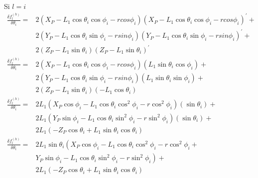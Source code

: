             Si  \( l=i \) 
            \begin{align*}
              \frac{ \delta f_{l}^{ \left( h \right) }}{ \delta  \theta _{i}}=&2 \left( X_{P}-L_{1}\cos  \theta _{i}\cos  \phi _{i}- rcos \phi _{i} \right)  \left( X_{P}-L_{1}\cos  \theta _{i}\cos  \phi _{i}- rcos \phi _{i} \right) ^{'}+\\
             &2 \left( Y_{P}-L_{1}\cos  \theta _{i}\sin  \phi _{i}- rsin \phi _{i} \right)  \left( Y_{P}-L_{1}\cos  \theta _{i}\sin  \phi _{i}- rsin \phi _{i} \right) ^{'}+\\
             &2 \left( Z_{P}-L_{1}\sin  \theta _{i} \right)  \left( Z_{P}-L_{1}\sin  \theta _{i} \right) ^{'} \\
              \frac{ \delta f_{l}^{ \left( h \right) }}{ \delta  \theta _{i}}=&2 \left( X_{P}-L_{1}\cos  \theta _{i}\cos  \phi _{i}- rcos \phi _{i} \right)  \left( L_{1}\sin  \theta _{i}\cos  \phi _{i} \right) +\\
             &2 \left( Y_{P}-L_{1}\cos  \theta _{i}\sin  \phi _{i}- rsin \phi _{i} \right)  \left( L_{1}\sin  \theta _{i}\sin  \phi _{i} \right) +\\
             &2 \left( Z_{P}-L_{1}\sin  \theta _{i} \right)  \left( -L_{1}\cos  \theta _{i} \right)  \\
              \frac{ \delta f_{l}^{ \left( h \right) }}{ \delta  \theta _{i}}=&2L_{1} \left( X_{P}\cos  \phi _{i}-L_{1}\cos  \theta _{i}\cos ^{2} \phi _{i}- r\cos ^{2} \phi _{i} \right)  \left( \sin  \theta _{i} \right) +\\
              &2L_{1} \left( Y_{P}\sin  \phi _{i}-L_{1}\cos  \theta _{i}\sin ^{2} \phi _{i}- r\sin ^{2} \phi _{i} \right)  \left( \sin  \theta _{i} \right) +\\
              &2 L_{1} \left( -Z_{P}\cos  \theta _{i}+L_{1}\sin  \theta _{i}\cos  \theta _{i} \right)  \\
              \frac{ \delta f_{l}^{ \left( h \right) }}{ \delta  \theta _{i}}=&2L_{1}\sin  \theta _{i} \left( X_{P}\cos  \phi _{i}-L_{1}\cos  \theta _{i}\cos ^{2} \phi _{i}- r\cos ^{2} \phi _{i}+\right.\\
              &\left. Y_{P}\sin  \phi _{i}-L_{1}\cos  \theta _{i}\sin ^{2} \phi _{i}- r\sin ^{2} \phi _{i} \right) +\\
              &2L_{1} \left( -Z_{P}\cos  \theta _{i}+L_{1}\sin  \theta _{i}\cos  \theta _{i} \right) \end{align*}

